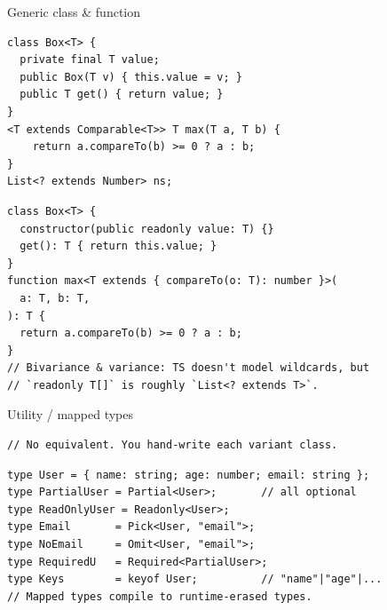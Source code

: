 \documentclass[10pt]{article}
\begin{document}
\begin{construct}{Generic class \& function}
\noindent
\begin{minipage}[t]{0.485\linewidth}
\begin{lstlisting}[style=java, title=Java]
class Box<T> {
  private final T value;
  public Box(T v) { this.value = v; }
  public T get() { return value; }
}
<T extends Comparable<T>> T max(T a, T b) {
    return a.compareTo(b) >= 0 ? a : b;
}
List<? extends Number> ns;
\end{lstlisting}
\end{minipage}\hfill
\begin{minipage}[t]{0.485\linewidth}
\begin{lstlisting}[style=ts, title=TypeScript]
class Box<T> {
  constructor(public readonly value: T) {}
  get(): T { return this.value; }
}
function max<T extends { compareTo(o: T): number }>(
  a: T, b: T,
): T {
  return a.compareTo(b) >= 0 ? a : b;
}
// Bivariance & variance: TS doesn't model wildcards, but
// `readonly T[]` is roughly `List<? extends T>`.
\end{lstlisting}
\end{minipage}
\end{construct}

\begin{construct}{Utility / mapped types}
\noindent
\begin{minipage}[t]{0.485\linewidth}
\begin{lstlisting}[style=java, title=Java]
// No equivalent. You hand-write each variant class.
\end{lstlisting}
\end{minipage}\hfill
\begin{minipage}[t]{0.485\linewidth}
\begin{lstlisting}[style=ts, title=TypeScript]
type User = { name: string; age: number; email: string };
type PartialUser = Partial<User>;       // all optional
type ReadOnlyUser = Readonly<User>;
type Email       = Pick<User, "email">;
type NoEmail     = Omit<User, "email">;
type RequiredU   = Required<PartialUser>;
type Keys        = keyof User;          // "name"|"age"|...
// Mapped types compile to runtime-erased types.
\end{lstlisting}
\end{minipage}
\end{construct}

\end{document}
